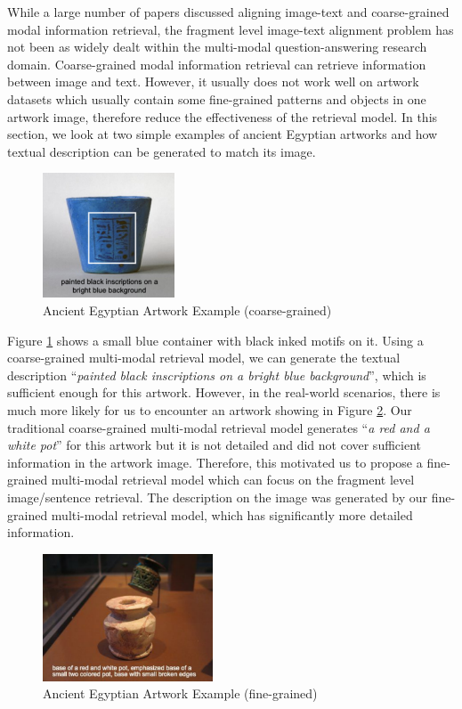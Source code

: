 While a large number of papers discussed aligning image-text and coarse-grained modal information retrieval, the fragment level image-text alignment problem has not been as widely dealt within the multi-modal question-answering research domain. Coarse-grained modal information retrieval can retrieve information between image and text. However, it usually does not work well on artwork datasets which usually contain some fine-grained patterns and objects in one artwork image, therefore reduce the effectiveness of the retrieval model. In this section, we look at two simple examples of ancient Egyptian artworks and how textual description can be generated to match its image.

\begin{figure}[h!]
\centering
\includegraphics[width=0.35\textwidth]{artwork_fine1.pdf}
\caption{Ancient Egyptian Artwork Example (coarse-grained)}
\label{fig:artwork1}
\end{figure}

Figure \ref{fig:artwork1} shows a small blue container with black inked motifs on it. Using a coarse-grained multi-modal retrieval model, we can generate the textual description ``\textit{painted black inscriptions on a bright blue background}'', which is sufficient enough for this artwork. However, in the real-world scenarios, there is much more likely for us to encounter an artwork showing in Figure \ref{fig:artwork2}. Our traditional coarse-grained multi-modal retrieval model generates ``\textit{a red and a white pot}'' for this artwork but it is not detailed and did not cover sufficient information in the artwork image. Therefore, this motivated us to propose a fine-grained multi-modal retrieval model which can focus on the fragment level image/sentence retrieval. The description on the image was generated by our fine-grained multi-modal retrieval model, which has significantly more detailed information.

\begin{figure}[h!]
\centering
\includegraphics[width=0.45\textwidth]{artwork_fine2.pdf}
\caption{Ancient Egyptian Artwork Example (fine-grained)}
\label{fig:artwork2}
\end{figure}


